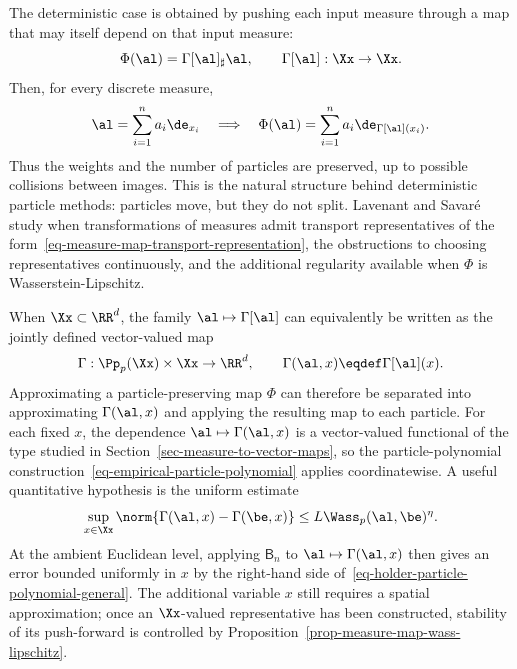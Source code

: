 The deterministic case is obtained by pushing each input measure through a map that may itself depend on that input measure:
\begin{equation}\label{eq-measure-map-transport-representation}
	\Phi(\al) = \Gamma[\al]_\sharp \al,
	\qquad
	\Gamma[\al] : \Xx \to \Xx.
\end{equation}
Then, for every discrete measure,
\begin{equation}\label{eq-measure-map-preserve-atoms}
	\al=\sum_{i=1}^n a_i\de_{x_i}
	\quad\Longrightarrow\quad
	\Phi(\al)=\sum_{i=1}^n a_i\de_{\Gamma[\al](x_i)}.
\end{equation}
Thus the weights and the number of particles are preserved, up to possible collisions between images. This is the natural structure behind deterministic particle methods: particles move, but they do not split. Lavenant and Savar\'e~\cite{LavenantSavare2026ContinuousTransformations} study when transformations of measures admit transport representatives of the form~\eqref{eq-measure-map-transport-representation}, the obstructions to choosing representatives continuously, and the additional regularity available when $\Phi$ is Wasserstein-Lipschitz.

When \(\Xx\subset\RR^d\), the family \(\al\mapsto\Gamma[\al]\) can equivalently be written as the jointly defined vector-valued map
\begin{equation}\label{eq-curried-transport-representative}
	\Gamma:\Pp_p(\Xx)\times\Xx\to\RR^d,
	\qquad
	\Gamma(\al,x)\eqdef\Gamma[\al](x).
\end{equation}
Approximating a particle-preserving map \(\Phi\) can therefore be separated into approximating \(\Gamma(\al,x)\) and applying the resulting map to each particle. For each fixed \(x\), the dependence \(\al\mapsto\Gamma(\al,x)\) is a vector-valued functional of the type studied in Section~\ref{sec-measure-to-vector-maps}, so the particle-polynomial construction~\eqref{eq-empirical-particle-polynomial} applies coordinatewise. A useful quantitative hypothesis is the uniform estimate
\[
	\sup_{x\in\Xx}
	\norm{\Gamma(\al,x)-\Gamma(\be,x)}
	\leq
	L\Wass_p(\al,\be)^\eta.
\]
At the ambient Euclidean level, applying \(\mathsf B_n\) to \(\al\mapsto\Gamma(\al,x)\) then gives an error bounded uniformly in \(x\) by the right-hand side of~\eqref{eq-holder-particle-polynomial-general}. The additional variable \(x\) still requires a spatial approximation; once an \(\Xx\)-valued representative has been constructed, stability of its push-forward is controlled by Proposition~\ref{prop-measure-map-wass-lipschitz}.

